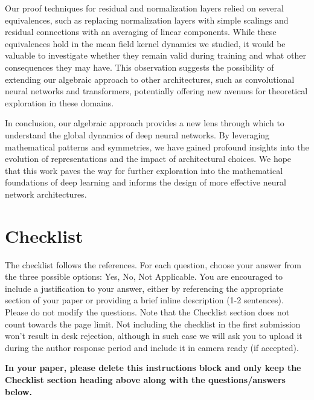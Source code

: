 \documentclass[twoside]{article}
\theoremstyle{definition}
\begin{document}
Our proof techniques for residual and normalization layers relied on several equivalences, such as replacing normalization layers with simple scalings and residual connections with an averaging of linear components. While these equivalences hold in the mean field kernel dynamics we studied, it would be valuable to investigate whether they remain valid during training and what other consequences they may have. This observation suggests the possibility of extending our algebraic approach to other architectures, such as convolutional neural networks and transformers, potentially offering new avenues for theoretical exploration in these domains.

In conclusion, our algebraic approach provides a new lens through which to understand the global dynamics of deep neural networks. By leveraging mathematical patterns and symmetries, we have gained profound insights into the evolution of representations and the impact of architectural choices. We hope that this work paves the way for further exploration into the mathematical foundations of deep learning and informs the design of more effective neural network architectures.





\onecolumn

\section*{Checklist}


The checklist follows the references. For each question, choose your answer from the three possible options: Yes, No, Not Applicable.  You are encouraged to include a justification to your answer, either by referencing the appropriate section of your paper or providing a brief inline description (1-2 sentences). 
Please do not modify the questions.  Note that the Checklist section does not count towards the page limit. Not including the checklist in the first submission won't result in desk rejection, although in such case we will ask you to upload it during the author response period and include it in camera ready (if accepted).

\textbf{In your paper, please delete this instructions block and only keep the Checklist section heading above along with the questions/answers below.}
\end{document}
